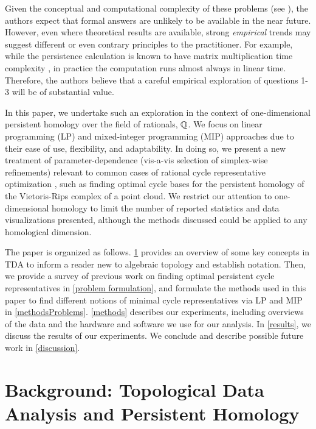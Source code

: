 Given the conceptual and computational complexity of these problems (see \cite{chenhardness}), the authors expect that formal answers are unlikely to be available in the near future. However, even where theoretical results are available, strong \emph{empirical} trends may suggest different or even contrary principles to the practitioner. For example, while the persistence calculation is known to have matrix multiplication time complexity  \cite{primoz}, in practice the computation runs almost always in linear time. Therefore, the authors believe that a careful empirical exploration of questions 1-3 will be of substantial value. 

In this paper, we undertake such an exploration in the context of one-dimensional persistent homology over the field of rationals, $\mathbb{Q}$. We focus on linear programming (LP) and mixed-integer programming (MIP) approaches due to their ease of use, flexibility, and adaptability. In doing so, we present a new treatment of parameter-dependence (vis-a-vis selection of simplex-wise refinements) relevant to common cases of rational cycle representative optimization \cite{Obayashi2018, Escolar2016}, such as finding optimal cycle bases for the persistent homology of the Vietoris-Rips complex of a point cloud. We restrict our attention to one-dimensional homology to limit the number of reported statistics and data visualizations presented, although the methods discussed could be applied to any homological dimension. 

The paper is organized as follows. \se \ref{sec:background} provides an overview of some key concepts in TDA to inform a reader new to algebraic topology and establish notation. Then, we provide a survey of previous work on finding optimal persistent cycle representatives in \se \ref{problem formulation}, and formulate the methods used in this paper to find different notions of minimal cycle representatives via LP and MIP in 
\se \ref{methodsProblems}. \se \ref{methods} describes our experiments, including overviews of the data and the hardware and software we use for our analysis. In \se \ref{results},  we discuss the results of our experiments. We conclude and describe possible future work in \se \ref{discussion}.
    
 \section{Background: Topological Data Analysis and Persistent Homology} 
\label{sec:background}


